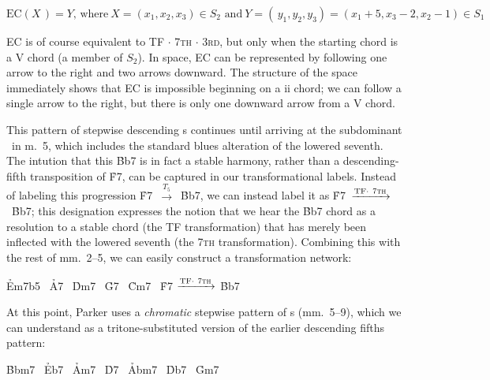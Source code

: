 \vspace{-3em}
\begin{displaymath}
  \mathrm{EC}(X\,) = Y\text{, where}\ X = (x_1, x_2, x_3) \in S_2
   \text{ and}\
  Y = (\,y_1, y_2, y_3) = (x_1 + 5, x_3 - 2, x_2 - 1) \in S_1
\end{displaymath}
\vspace{-3em}

\noindent EC is of course equivalent to TF $\cdot$ \textsc{7th} $\cdot$
\textsc{3rd}, but only when the starting chord is a V\tsup{7} chord (a member
of $S_2$). In \tf space, EC can be represented by following one arrow to the
right and two arrows downward. The structure of the space immediately shows
that EC is impossible beginning on a ii chord; we can follow a single
arrow to the right, but there is only one downward arrow from a V\tsup{7}
chord.\fn{tft-7}

This pattern of stepwise descending \tf{}s continues until arriving at the
subdominant \Bflat\ in m.~5, which includes the standard blues alteration of
the lowered seventh.\fn{tft-6} The intution that this \h{Bb7} is in fact a
stable harmony, rather than a descending-fifth transposition of \h{F7}, can be
captured in our transformational labels. Instead of labeling this progression
\mbox{\h{F7} $\xrightarrow{T_5}$ \h{Bb7}}, we can instead label it as
\mbox{\h{F7} $\xrightarrow{\mathrm{TF} \cdot\ \text{\textsc{7th}}}$ \h{Bb7}};
this designation expresses the notion that we hear the \h{Bb7} chord as a
resolution to a stable chord (the TF transformation) that has merely been
inflected with the lowered seventh (the \textsc{7th} transformation).
Combining this with the rest of mm.~2--5, we can easily construct a
transformation network:

\begin{center}
  \h{Em7b5} \TFarrow\ \h{A7} \ECarrow\
  \h{Dm7}   \TFarrow\ \h{G7} \ECarrow\
  \h{Cm7}   \TFarrow\ \h{F7} $\xrightarrow{\mathrm{TF} \cdot\ \text{\textsc{7th}}}$
  \h{Bb7}
\end{center}


At this point, Parker uses a \emph{chromatic} stepwise pattern of \tf{}s
(mm.~5--9), which we can understand as a tritone-substituted version of the
earlier descending fifths pattern:

\begin{center}
  \h{Bbm7} \TFTarrow\ \h{Eb7} \ECTarrow\
  \h{Am7}  \TFTarrow\ \h{D7}  \ECTarrow\
  \h{Abm7} \TFTarrow\ \h{Db7} \ECTarrow\
  \h{Gm7}
\end{center}

